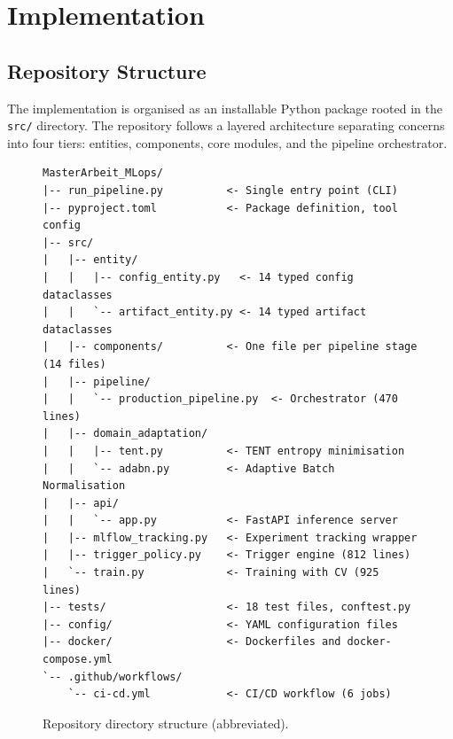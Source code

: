 \chapter{Implementation}
\label{ch:implementation}

\section{Repository Structure}
\label{sec:repo_structure}

The implementation is organised as an installable Python package rooted in
the \texttt{src/} directory.
The repository follows a layered architecture separating concerns into four
tiers: entities, components, core modules, and the pipeline orchestrator.

\begin{figure}[ht]
  \centering
\begin{lstlisting}[language={},basicstyle=\ttfamily\footnotesize,
                   numbers=none, backgroundcolor=\color{backcolour}]
MasterArbeit_MLops/
|-- run_pipeline.py          <- Single entry point (CLI)
|-- pyproject.toml           <- Package definition, tool config
|-- src/
|   |-- entity/
|   |   |-- config_entity.py   <- 14 typed config dataclasses
|   |   `-- artifact_entity.py <- 14 typed artifact dataclasses
|   |-- components/          <- One file per pipeline stage (14 files)
|   |-- pipeline/
|   |   `-- production_pipeline.py  <- Orchestrator (470 lines)
|   |-- domain_adaptation/
|   |   |-- tent.py          <- TENT entropy minimisation
|   |   `-- adabn.py         <- Adaptive Batch Normalisation
|   |-- api/
|   |   `-- app.py           <- FastAPI inference server
|   |-- mlflow_tracking.py   <- Experiment tracking wrapper
|   |-- trigger_policy.py    <- Trigger engine (812 lines)
|   `-- train.py             <- Training with CV (925 lines)
|-- tests/                   <- 18 test files, conftest.py
|-- config/                  <- YAML configuration files
|-- docker/                  <- Dockerfiles and docker-compose.yml
`-- .github/workflows/
    `-- ci-cd.yml            <- CI/CD workflow (6 jobs)
\end{lstlisting}
  \caption{Repository directory structure (abbreviated).}
  \label{fig:repo_structure}
\end{figure}

